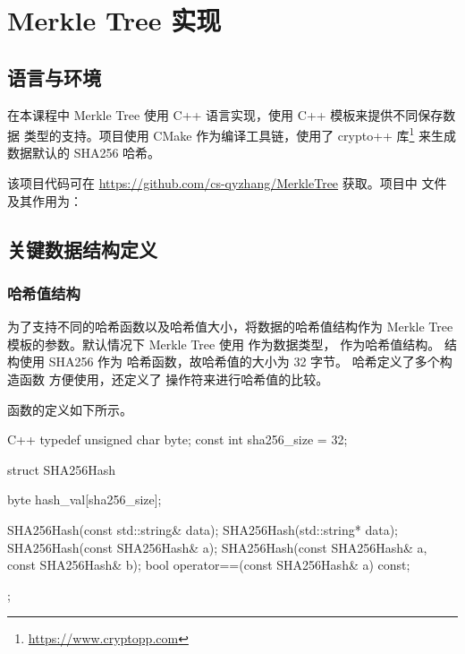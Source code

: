 \documentclass{mydoc}
\begin{document}
\section{Merkle Tree 实现}

\subsection{语言与环境}

在本课程中 Merkle Tree 使用 C++ 语言实现，使用 C++ 模板来提供不同保存数据
类型的支持。项目使用 CMake 作为编译工具链，使用了 crypto++ 库\footnote{\url{https://www.cryptopp.com}}
来生成数据默认的
SHA256 哈希。

该项目代码可在 \url{https://github.com/cs-qyzhang/MerkleTree} 获取。项目中
文件及其作用为：


\vfill

\subsection{关键数据结构定义}

\subsubsection{哈希值结构}

为了支持不同的哈希函数以及哈希值大小，将数据的哈希值结构作为 Merkle Tree
模板的参数。默认情况下 Merkle Tree 使用  作为数据类型，
 作为哈希值结构。 结构使用 SHA256 作为
哈希函数，故哈希值的大小为 32 字节。 哈希定义了多个构造函数
方便使用，还定义了 \code{==} 操作符来进行哈希值的比较。

 函数的定义如下所示。

\begin{codes}{C++}
typedef unsigned char byte;
const int sha256_size = 32;

struct SHA256Hash {
  byte hash_val[sha256_size];

  SHA256Hash(const std::string& data);
  SHA256Hash(std::string* data);
  SHA256Hash(const SHA256Hash& a);
  SHA256Hash(const SHA256Hash& a, const SHA256Hash& b);
  bool operator==(const SHA256Hash& a) const;
};
\end{codes}
\end{document}
